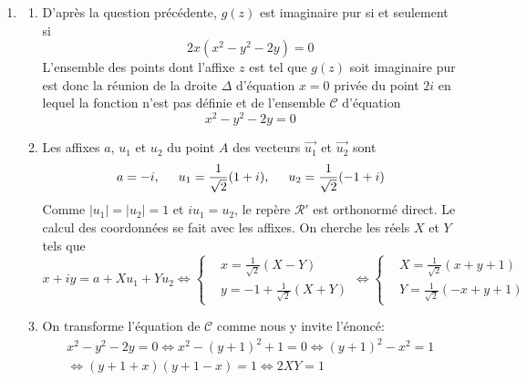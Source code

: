 \begin{enumerate}
\item 
\begin{enumerate}
  \item D'après la question précédente, $g(z)$ est imaginaire pur si et seulement si
\begin{displaymath}
 2x(x^2-y^2-2y)=0
\end{displaymath}
L'ensemble des points dont l'affixe $z$ est tel que $g(z)$ soit imaginaire pur est donc la réunion de la droite $\Delta$ d'équation $x=0$ privée du point $2i$ en lequel la fonction n'est pas définie et de l'ensemble $\mathcal{C}$ d'équation 
\begin{displaymath}
 x^2-y^2-2y=0 
\end{displaymath}

  \item Les affixes $a$, $u_1$ et $u_2$ du point $A$ des vecteurs $\overrightarrow{u_1}$ et $\overrightarrow{u_2}$ sont
\begin{displaymath}
  a = -i,\hspace{0.5cm} u_1 = \frac{1}{\sqrt{2}}(1+i),\hspace{0.5cm} u_2 = \frac{1}{\sqrt{2}}(-1+i)
\end{displaymath}
Comme $|u_1| = |u_2|=1$ et $iu_1=u_2$, le repère $\mathcal{R}'$ est orthonormé direct.\newline
Le calcul des coordonnées se fait avec les affixes. On cherche les réels $X$ et $Y$ tels que 
\begin{displaymath}
  x + iy = a + Xu_1 + Yu_2 \Leftrightarrow
\left\lbrace 
\begin{aligned}
  &x = \frac{1}{\sqrt{2}}\left( X - Y\right) \\ 
  &y = -1 + \frac{1}{\sqrt{2}}\left( X + Y\right)
\end{aligned}
\right. 
\Leftrightarrow
\left\lbrace 
\begin{aligned}
  &X = \frac{1}{\sqrt{2}}\left( x + y + 1\right)\\
  &Y = \frac{1}{\sqrt{2}}\left( -x + y + 1\right)
\end{aligned}
\right. 
\end{displaymath}
  \item On transforme l'équation de $\mathcal{C}$ comme nous y invite l'énoncé:
\begin{multline*}
  x^2 - y^2-2y = 0 \Leftrightarrow x^2 - (y+1)^2 +1 = 0 \Leftrightarrow
  (y+1)^2-x^2 = 1  \\ \Leftrightarrow (y+1+x)(y+1-x) = 1
  \Leftrightarrow 2XY = 1
\end{multline*}

\end{enumerate}
\end{enumerate}
